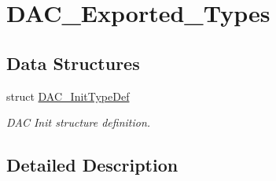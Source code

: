 \hypertarget{group___d_a_c___exported___types}{}\section{D\+A\+C\+\_\+\+Exported\+\_\+\+Types}
\label{group___d_a_c___exported___types}
\subsection*{Data Structures}
\begin{DoxyCompactItemize}
\item 
struct \mbox{\hyperlink{struct_d_a_c___init_type_def}{D\+A\+C\+\_\+\+Init\+Type\+Def}}
\begin{DoxyCompactList}\small\item\em D\+AC Init structure definition. \end{DoxyCompactList}\end{DoxyCompactItemize}


\subsection{Detailed Description}
